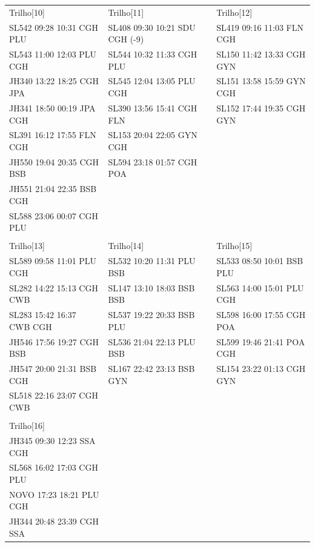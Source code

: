 \documentclass{endm}
\begin{document}
\begin{center}
\begin{longtable}{lll}
\\

\scriptsize Trilho[10] &       \scriptsize Trilho[11] &       \scriptsize Trilho[12] \\
\scriptsize SL542 09:28 10:31 CGH PLU &       \scriptsize SL408 09:30 10:21 SDU CGH (-9) &       \scriptsize SL419 09:16 11:03 FLN CGH\\
\scriptsize SL543 11:00 12:03 PLU CGH &       \scriptsize SL544 10:32 11:33 CGH PLU &       \scriptsize SL150 11:42 13:33 CGH GYN\\
\scriptsize JH340 13:22 18:25 CGH JPA &       \scriptsize SL545 12:04 13:05 PLU CGH &       \scriptsize SL151 13:58 15:59 GYN CGH\\
\scriptsize JH341 18:50 00:19 JPA CGH &       \scriptsize SL390 13:56 15:41 CGH FLN &       \scriptsize SL152 17:44 19:35 CGH GYN\\
\scriptsize SL391 16:12 17:55 FLN CGH &       \scriptsize SL153 20:04 22:05 GYN CGH & \\
\scriptsize JH550 19:04 20:35 CGH BSB &       \scriptsize SL594 23:18 01:57 CGH POA & \\
\scriptsize JH551 21:04 22:35 BSB CGH	& & \\
\scriptsize SL588 23:06 00:07 CGH PLU	& & \\

\\

\scriptsize Trilho[13] &       \scriptsize Trilho[14] &       \scriptsize Trilho[15] \\
\scriptsize SL589 09:58 11:01 PLU CGH &       \scriptsize SL532 10:20 11:31 PLU BSB &       \scriptsize SL533 08:50 10:01 BSB PLU \\
\scriptsize SL282 14:22 15:13 CGH CWB &       \scriptsize 	SL147 13:10 18:03 BSB BSB &       \scriptsize SL563 14:00 15:01 PLU CGH \\
\scriptsize SL283 15:42 16:37 CWB CGH &       \scriptsize 	SL537 19:22 20:33 BSB PLU &       \scriptsize SL598 16:00 17:55 CGH POA \\
\scriptsize JH546 17:56 19:27 CGH BSB &       \scriptsize SL536 21:04 22:13 PLU BSB &       \scriptsize SL599 19:46 21:41 POA CGH \\
\scriptsize JH547 20:00 21:31 BSB CGH &       \scriptsize SL167 22:42 23:13 BSB GYN &       \scriptsize SL154 23:22 01:13 CGH GYN \\
\scriptsize SL518 22:16 23:07 CGH CWB	 & & \\	

\\
		
\scriptsize Trilho[16]	& & \\	
\scriptsize JH345 09:30 12:23 SSA CGH	& & \\
\scriptsize SL568 16:02 17:03 CGH PLU	& & \\
\scriptsize NOVO  17:23 18:21 PLU CGH	& & \\
\scriptsize JH344 20:48 23:39 CGH SSA	& & \\	


		
\end{longtable}

\end{center}
\end{document}
